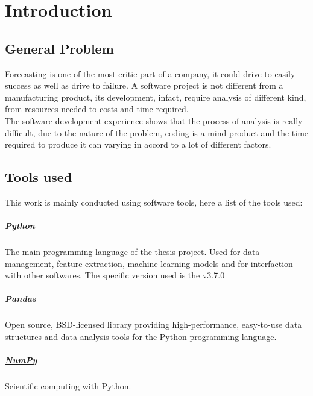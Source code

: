 \documentclass[%
    corpo=12pt,
    twoside,
    oldstyle,
    autoretitolo,
    greek,
    evenboxes,
]{toptesi}
\begin{document}
\indici

\mainmatter


\chapter{Introduction}

\section{General Problem}
Forecasting is one of the most critic part of a company, it could drive to easily success as well as drive to failure. A software project is not different from a manufacturing product, its development, infact, require analysis of different kind, from resources needed to costs and time required.\\
The software development experience shows that the process of analysis is really difficult, due to the nature of the problem, coding is a mind product and the time required to produce it can varying in accord to a lot of different factors.

\section{Tools used}
This work is mainly conducted using software tools, here a list of the tools used:

\paragraph{\href{https://www.python.org/}{Python}} The main programming language of the thesis project. Used for data management, feature extraction, machine learning models and for interfaction with other softwares. The specific version used is the v3.7.0

\paragraph{\href{https://pandas.pydata.org/}{Pandas}} Open source, BSD-licensed library providing high-performance, easy-to-use data structures and data analysis tools for the Python programming language.

\paragraph{\href{https://numpy.org/}{NumPy}} Scientific computing with Python.
\end{document}
